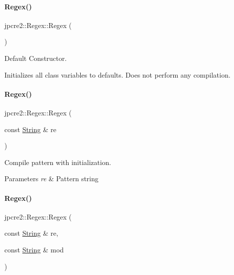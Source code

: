 \paragraph{\texorpdfstring{Regex()}{Regex()}\hspace{0.1cm}{\footnotesize\ttfamily [1/6]}}
{\footnotesize\ttfamily jpcre2\+::\+Regex\+::\+Regex (\begin{DoxyParamCaption}{ }\end{DoxyParamCaption})\hspace{0.3cm}{\ttfamily [inline]}}



Default Constructor. 

Initializes all class variables to defaults. Does not perform any compilation. \hypertarget{classjpcre2_1_1Regex_a4d959fdc32791bee6d819abfc44af51a_a4d959fdc32791bee6d819abfc44af51a}{}\label{classjpcre2_1_1Regex_a4d959fdc32791bee6d819abfc44af51a_a4d959fdc32791bee6d819abfc44af51a} 
\paragraph{\texorpdfstring{Regex()}{Regex()}\hspace{0.1cm}{\footnotesize\ttfamily [2/6]}}
{\footnotesize\ttfamily jpcre2\+::\+Regex\+::\+Regex (\begin{DoxyParamCaption}\item[{const \hyperlink{namespacejpcre2_a91f03070152fb228bc116c5a737f1d16}{String} \&}]{re }\end{DoxyParamCaption})\hspace{0.3cm}{\ttfamily [inline]}}



Compile pattern with initialization. 


\begin{DoxyParams}{Parameters}
{\em re} & Pattern string \\
\hline
\end{DoxyParams}
\hypertarget{classjpcre2_1_1Regex_a58be9b4e1eaec2a43586af45c6ae5549_a58be9b4e1eaec2a43586af45c6ae5549}{}\label{classjpcre2_1_1Regex_a58be9b4e1eaec2a43586af45c6ae5549_a58be9b4e1eaec2a43586af45c6ae5549} 
\paragraph{\texorpdfstring{Regex()}{Regex()}\hspace{0.1cm}{\footnotesize\ttfamily [3/6]}}
{\footnotesize\ttfamily jpcre2\+::\+Regex\+::\+Regex (\begin{DoxyParamCaption}\item[{const \hyperlink{namespacejpcre2_a91f03070152fb228bc116c5a737f1d16}{String} \&}]{re,  }\item[{const \hyperlink{namespacejpcre2_a91f03070152fb228bc116c5a737f1d16}{String} \&}]{mod }\end{DoxyParamCaption})\hspace{0.3cm}{\ttfamily [inline]}}



